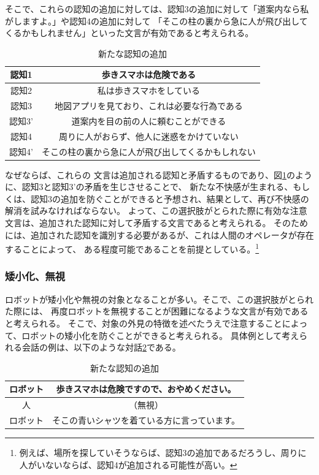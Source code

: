 \documentclass[11pt,a4j]{jreport}
\begin{document}
そこで、これらの認知の追加に対しては、認知3の追加に対して「道案内なら私がしますよ。」や認知4の追加に対して
「そこの柱の裏から急に人が飛び出してくるかもしれません」といった文言が有効であると考えられる。
\begin{table}[h]
  \centering
  
  \label{fig: AvoidDissonanceBlock}
  \begin{tabular}{c|c}
      認知1 & 歩きスマホは危険である \\ \hline
      認知2 & 私は歩きスマホをしている \\ \hline
      認知3 & 地図アプリを見ており、これは必要な行為である \\
      認知3' & 道案内を目の前の人に頼むことができる \\ \hline
      認知4 & 周りに人がおらず、他人に迷惑をかけていない \\ 
      認知4' & そこの柱の裏から急に人が飛び出してくるかもしれない \\ 
  \end{tabular}
  \caption{新たな認知の追加}
\end{table}
なぜならば、これらの
文言は追加される認知と矛盾するものであり、図\ref{fig: AvoidDissonanceBlock}のように、認知3と認知3'の矛盾を生じさせることで、
新たな不快感が生まれる、もしくは、認知3の追加を防ぐことができると予想され、結果として、再び不快感の解消を試みなければならない。
よって、この選択肢がとられた際に有効な注意文言は、追加された認知に対して矛盾する文言であると考えられる。
そのためには、追加された認知を識別する必要があるが、これは人間のオペレータが存在することによって、
ある程度可能であることを前提としている。\footnote[1]{例えば、場所を探していそうならば、認知3の追加であるだろうし、周りに人がいないならば、認知4が追加される可能性が高い。}


\subsubsection{矮小化、無視}
ロボットが矮小化や無視の対象となることが多い\cite{Schneider2022}。そこで、この選択肢がとられた際には、
再度ロボットを無視することが困難になるような文言が有効であると考えられる。
そこで、対象の外見の特徴を述べたうえで注意することによって、ロボットの矮小化を防ぐことができると考えられる。
具体例として考えられる会話の例は、以下のような対話\ref{dialogue: Ignore}である。
\begin{table}[h]
  \centering
  
  \label{dialogue: Ignore}
  \begin{tabular}{c|c}
      ロボット & 歩きスマホは危険ですので、おやめください。 \\ \hline
      人 & （無視） \\ \hline
      ロボット & そこの青いシャツを着ている方に言っています。 \\ 
  \end{tabular}
  \caption{新たな認知の追加}
\end{table}
\end{document}
